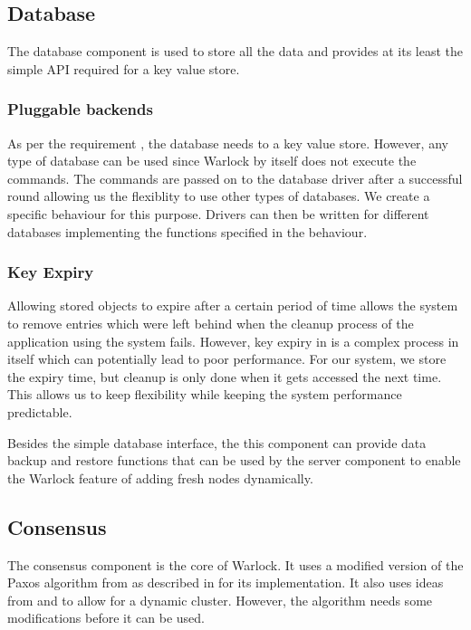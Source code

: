 \subsection{Database}

The database component is used to store all the data and provides at its
least the simple API required for a key value store.

\subsubsection{Pluggable backends}

As per the requirement , the database needs to a
key value store. However, any type of database can be used
since Warlock by itself does not execute the commands. The commands are passed
on to the database driver after a successful round allowing us the flexiblity
to use other types of databases. We create a specific behaviour%
for this purpose. Drivers can then be written for different databases
implementing the functions specified in the behaviour.

\subsubsection{Key Expiry}
\label{section:a.n.d.expiry}

Allowing stored objects to expire after a certain period of time allows the
system to remove entries which were left behind when the cleanup process
of the application using the system fails. However, key expiry in is a
complex process in itself  which can potentially lead to
poor performance. For our system, we store the expiry time, but cleanup is
only done when it gets accessed the next time. This allows us to keep
flexibility while keeping the system performance predictable.

Besides the simple database interface, the this component can provide data
backup and restore functions that can be used by the server component to
enable the Warlock feature of adding fresh nodes dynamically.

\subsection{Consensus}

The consensus component is the core of Warlock. It uses a modified version of
the Paxos algorithm from \citet{Robbert2011} as described in
 for its implementation. It also
uses ideas from \citet{LamportSP08} and \citet{LamportMZ10} to allow for
a dynamic cluster. However, the algorithm needs some modifications
 before it can be used.

